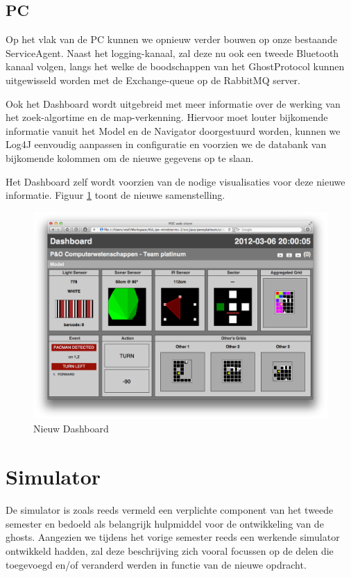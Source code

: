 \documentclass[12pt,a4paper]{report}
\begin{document}
\section{PC}

Op het vlak van de PC kunnen we opnieuw verder bouwen op onze bestaande ServiceAgent. Naast het logging-kanaal, zal deze nu ook een tweede Bluetooth kanaal volgen, langs het welke de boodschappen van het GhostProtocol kunnen uitgewisseld worden met de Exchange-queue op de RabbitMQ server.

Ook het Dashboard wordt uitgebreid met meer informatie over de werking van het zoek-algortime en de map-verkenning. Hiervoor moet louter bijkomende informatie vanuit het Model en de Navigator doorgestuurd worden, kunnen we Log4J eenvoudig aanpassen in configuratie en voorzien we de databank van bijkomende kolommen om de nieuwe gegevens op te slaan.

Het Dashboard zelf wordt voorzien van de nodige visualisaties voor deze nieuwe informatie. Figuur \ref{fig:dashboard} toont de nieuwe samenstelling.

\begin{figure}[htbp]
  \centering
  \includegraphics[width=155mm]{resources/dashboard.png}
  \caption{Nieuw Dashboard}
  \label{fig:dashboard}
\end{figure}

\chapter{Simulator}

De simulator is zoals reeds vermeld een verplichte component van het tweede semester en bedoeld als belangrijk hulpmiddel voor de ontwikkeling van de ghosts. Aangezien we tijdens het vorige semester reeds een werkende simulator ontwikkeld hadden, zal deze beschrijving zich vooral focussen op de delen die toegevoegd en/of veranderd werden in functie van de nieuwe opdracht.
\end{document}
